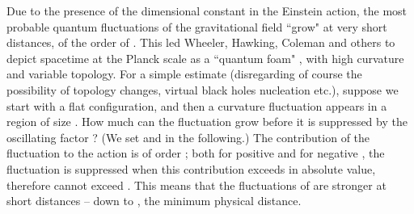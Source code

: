 \documentclass[a4paper,11pt]{article}
\begin{document}
Due to the presence of the dimensional constant \coordHE{} 
in the Einstein action, the most probable quantum 
fluctuations of the gravitational field ``grow" at very 
short distances, of the order of \coordHE{}. This led Wheeler, Hawking, 
Coleman and others to depict spacetime at the Planck 
scale as a ``quantum foam" \cite{haw}, with high curvature 
and variable topology. For a simple estimate
(disregarding of course the possibility of topology 
changes, virtual black holes nucleation etc.), suppose 
we start with a 
flat configuration, and then a curvature fluctuation 
appears in a region of size \coordHE{}. How much can the 
fluctuation grow before it is suppressed by the
oscillating factor \myHighlight{$\exp[iS]$}\coordHE{}? (We set \coordHE{} and
\coordHE{} in the following.) The contribution of the 
fluctuation to the action is of order \coordHE{}; both for 
positive and for negative \coordHE{}, the fluctuation is 
suppressed when this contribution exceeds \coordHE{} in
absolute value, therefore \coordHE{} cannot exceed \coordHE{}. This means that the fluctuations of \coordHE{} are 
stronger at short distances -- down to \coordHE{}, the 
minimum physical distance.
 
\end{document}
